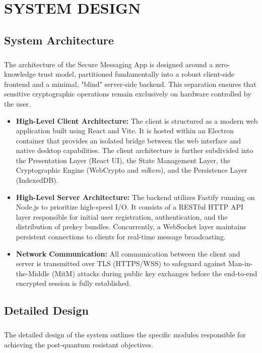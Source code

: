 \chapter{\MakeUppercase{System Design}}

\section{System Architecture}
\paragraph{}
The architecture of the Secure Messaging App is designed around a zero-knowledge trust model, partitioned fundamentally into a robust client-side frontend and a minimal, "blind" server-side backend. This separation ensures that sensitive cryptographic operations remain exclusively on hardware controlled by the user.

\begin{itemize}
    \item \textbf{High-Level Client Architecture:} The client is structured as a modern web application built using React and Vite. It is hosted within an Electron container that provides an isolated bridge between the web interface and native desktop capabilities. The client architecture is further subdivided into the Presentation Layer (React UI), the State Management Layer, the Cryptographic Engine (WebCrypto and \textit{mlkem}), and the Persistence Layer (IndexedDB).
    \item \textbf{High-Level Server Architecture:} The backend utilizes Fastify running on Node.js to prioritize high-speed I/O. It consists of a RESTful HTTP API layer responsible for initial user registration, authentication, and the distribution of prekey bundles. Concurrently, a WebSocket layer maintains persistent connections to clients for real-time message broadcasting.
    \item \textbf{Network Communication:} All communication between the client and server is transmitted over TLS (HTTPS/WSS) to safeguard against Man-in-the-Middle (MitM) attacks during public key exchanges before the end-to-end encrypted session is fully established. 
\end{itemize}

\section{Detailed Design}
\paragraph{}
The detailed design of the system outlines the specific modules responsible for achieving the post-quantum resistant objectives. 

